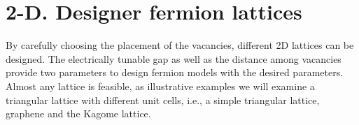 \documentclass[a4paper]{article}
\newcommand{\ket}[1]{|#1\rangle}
\newcommand{\bra}[1]{\langle#1|}
\renewcommand{\red}[1]{\textcolor{red}{#1}}
\begin{document}
%
%
%
%
%
%





\section{2-D. Designer fermion lattices} %
By carefully choosing the placement of the vacancies, different 2D lattices can be designed. The electrically tunable gap as well as the distance among vacancies provide two parameters to design fermion models with the desired parameters.
Almost any lattice is feasible, as illustrative examples we will examine a triangular lattice with different unit cells, i.e., a simple triangular lattice, graphene and the Kagome lattice.
\end{document}
